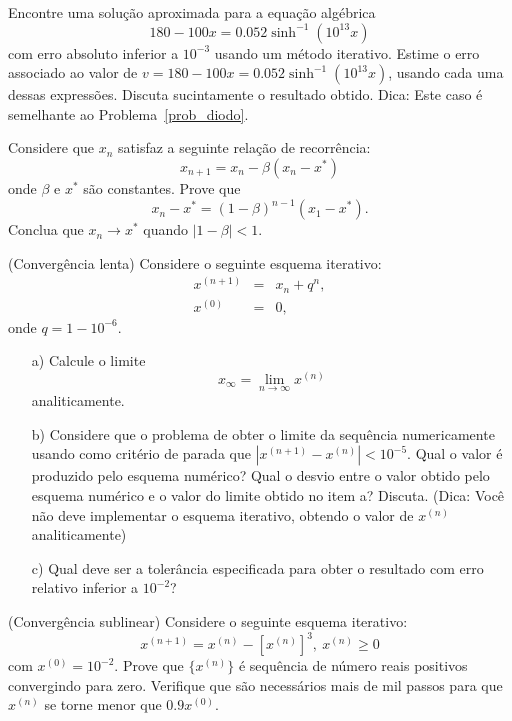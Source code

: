 \begin{exer} Encontre uma solução aproximada para a equação algébrica
\begin{equation} 180-100x=0.052\sinh^{-1}(10^{13}x) \end{equation}
com erro absoluto inferior a $10^{-3}$ usando um método iterativo.
Estime o erro associado ao valor de $v=180-100x=0.052\sinh^{-1}(10^{13}x)$, usando cada uma dessas expressões. Discuta sucintamente o resultado obtido. Dica: Este caso é semelhante ao Problema~\ref{prob_diodo}.
\end{exer}

\begin{exer}Considere que $x_n$ satisfaz a seguinte relação de recorrência:
\begin{equation} x_{n+1}=x_n - \beta \left(x_n-x^*\right) \end{equation}
onde $\beta$ e $x^*$ são constantes.
Prove que \begin{equation} x_n-x^*=(1-\beta)^{n-1}(x_1-x^*). \end{equation}
Conclua que $x_n\to x^*$ quando $|1-\beta|<1$.
\end{exer}

\begin{exer}(Convergência lenta) Considere o seguinte esquema iterativo:
  \begin{eqnarray}
    x^{(n+1)} &=& x_n+q^n,\\
    x^{(0)} &=& 0,
  \end{eqnarray}
onde $q=1-10^{-6}$.
\begin{itemize}
\item[a)] Calcule o limite \begin{equation} x_\infty=\lim_{n\to\infty}x^{(n)} \end{equation} analiticamente.
\item[b)] Considere que o problema de obter o limite da sequência numericamente usando como critério de parada que $|x^{(n+1)}-x^{(n)}|<10^{-5}$. Qual o valor é produzido pelo esquema numérico? Qual o desvio entre o valor obtido pelo esquema numérico e o valor do limite obtido no item a?  Discuta. (Dica: Você não deve implementar o esquema iterativo, obtendo o valor de $x^{(n)}$ analiticamente)
\item[c)] Qual deve ser a tolerância especificada para obter o resultado com erro relativo inferior a $10^{-2}$?
\end{itemize}
\end{exer}

\begin{exer}(Convergência sublinear) Considere o seguinte esquema iterativo:
\begin{equation} x^{(n+1)}=x^{(n)}-[x^{(n)}]^3,\ x^{(n)}\geq 0 \end{equation}
com $x^{(0)}= 10^{-2}$.
Prove que $\{x^{(n)}\}$ é sequência de número reais positivos convergindo para zero. Verifique que são necessários mais de mil passos para que $x^{(n)}$ se torne menor que $0.9 x^{(0)}$.
\end{exer}



